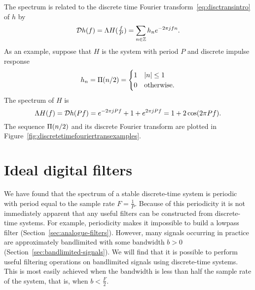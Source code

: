 The spectrum is related to the discrete time Fourier transform~\eqref{eq:disctransintro} of $h$ by
\[
{\mathcal D} h(f) = \Lambda H(\tfrac{f}{P}) =\sum_{n \in {\mathbb Z}} h_n e^{-2\pi j f n}.
\]
As an example, suppose that $H$ is the system with period $P$ and discrete impulse response
\[
h_n = \Pi(n/2) = \begin{cases}
1 & \left\vert n \right\vert \leq 1 \\
0 & \text{otherwise}.
\end{cases}
\]
The spectrum of $H$ is
\[
\Lambda H(f) = {\mathcal D} h(Pf) = e^{-2\pi j P f} + 1 + e^{2\pi j P f} = 1 + 2\cos(2\pi P f).
\]
The sequence $\Pi(n/2)$ and its discrete Fourier transform are plotted in Figure~\ref{fig:discretetimefouriertransexamples}.
% 

\section{Ideal digital filters}\label{sec:ideal_digital_filters}

We have found that the spectrum of a stable discrete-time system is periodic with period equal to the sample rate $F = \tfrac{1}{P}$.  Because of this periodicity it is not immediately apparent that any useful filters can be constructed from discrete-time systems.  For example, periodicity makes it impossible to build a lowpass filter (Section~\ref{sec:analogue-filters}).  However, many signals occurring in practice are approximately bandlimited with some bandwidth $b > 0$ (Section~\ref{sec:bandlimited-signals}).  We will find that it is possible to perform useful filtering operations on bandlimited signals using discrete-time systems.  This is most easily achieved when the bandwidth is less than half the sample rate of the system, that is, when $b < \tfrac{F}{2}$.

